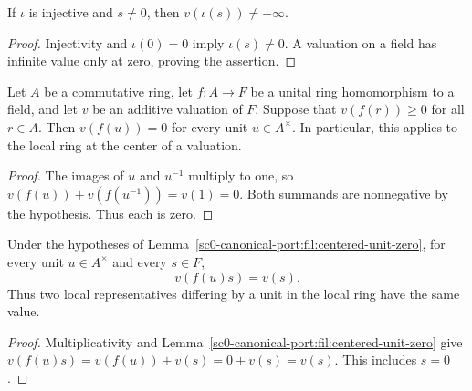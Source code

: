 \begin{lemma}
\label{sc0-canonical-port:fil:valuation-finite}
\leanok
If \(\iota\) is injective and \(s\ne0\), then
\(v(\iota(s))\ne+\infty\).
\end{lemma}
\begin{proof}
Injectivity and \(\iota(0)=0\) imply \(\iota(s)\ne0\). A valuation
on a field has infinite value only at zero, proving the assertion.
\end{proof}

\begin{lemma}
\label{sc0-canonical-port:fil:centered-unit-zero}
\leanok
Let \(A\) be a commutative ring, let \(f:A\to F\) be a unital ring
homomorphism to a field, and let \(v\) be an additive valuation of
\(F\). Suppose that \(v(f(r))\geq0\) for all \(r\in A\).
Then \(v(f(u))=0\) for every unit \(u\in A^\times\).
In particular, this applies to the local ring at the center of a
valuation.
\end{lemma}
\begin{proof}
The images of \(u\) and \(u^{-1}\) multiply to one, so
\(v(f(u))+v(f(u^{-1}))=v(1)=0\). Both summands are nonnegative by
the hypothesis. Thus each is zero.
\end{proof}

\begin{lemma}
\label{sc0-canonical-port:fil:frame-invariance}
\leanok
Under the hypotheses of Lemma~\ref{sc0-canonical-port:fil:centered-unit-zero}, for every
unit \(u\in A^\times\) and every \(s\in F\),
\[
 v(f(u)s)=v(s).
\]
Thus two local representatives differing by a unit in the local ring
have the same value.
\end{lemma}
\begin{proof}
Multiplicativity and Lemma~\ref{sc0-canonical-port:fil:centered-unit-zero} give
\(v(f(u)s)=v(f(u))+v(s)=0+v(s)=v(s)\). This includes \(s=0\).
\end{proof}


